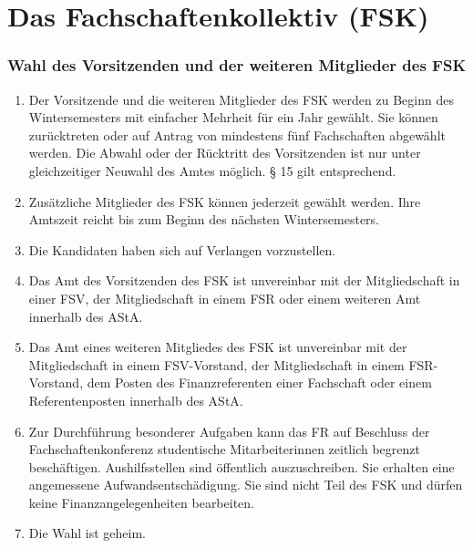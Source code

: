 \documentclass{article}
\begin{document}
\part{Das Fachschaftenkollektiv (FSK)}
\section{Wahl des Vorsitzenden und der weiteren Mitglieder des FSK}
\begin{enumerate}[(1)]
    \item Der Vorsitzende und die weiteren Mitglieder des FSK werden zu Beginn des Wintersemesters mit einfacher Mehrheit für ein Jahr gewählt. 
    	Sie können zurücktreten oder auf Antrag von mindestens fünf Fachschaften abgewählt werden. 
    	Die Abwahl oder der Rücktritt des Vorsitzenden ist nur unter gleichzeitiger Neuwahl des Amtes möglich. 
    	§ 15 gilt entsprechend.
    \item Zusätzliche Mitglieder des FSK können jederzeit gewählt werden. Ihre Amtszeit reicht bis zum Beginn des nächsten Wintersemesters.
    \item Die Kandidaten haben sich auf Verlangen vorzustellen.
    \item Das Amt des Vorsitzenden des FSK ist unvereinbar mit der Mitgliedschaft in einer FSV, der Mitgliedschaft in einem FSR oder einem weiteren Amt innerhalb des AStA.
    \item Das Amt eines weiteren Mitgliedes des FSK ist unvereinbar mit der Mitgliedschaft in einem FSV-Vorstand, der Mitgliedschaft in einem FSR-Vorstand, dem Posten des Finanzreferenten einer Fachschaft oder einem Referentenposten innerhalb des AStA.
    \item Zur Durchführung besonderer Aufgaben kann das FR auf Beschluss der Fachschaftenkonferenz studentische Mitarbeiterinnen zeitlich begrenzt beschäftigen. Aushilfsstellen sind öffentlich auszuschreiben. 
    	Sie erhalten eine angemessene Aufwandsentschädigung. 
    	Sie sind nicht Teil des FSK und dürfen keine Finanzangelegenheiten bearbeiten.
    \item Die Wahl ist geheim. 
\end{enumerate}
\end{document}
